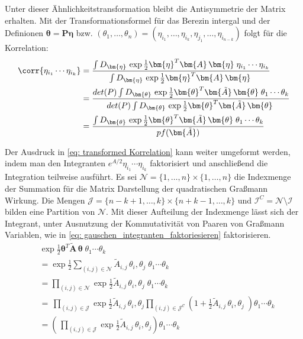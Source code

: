\noindent Unter dieser Ähnlichkeitstransformation bleibt die Antisymmetrie der Matrix erhalten. Mit der Transformationsformel für das Berezin intergal und der Definionen $ \bm{\theta} = \bm{P} \bm{\eta} $ bzw. $ (\theta_1, \dots, \theta_n) =  (\eta_{i_1}, \dots ,\eta_{i_k}, \eta_{j_1}, \dots, \eta_{i_{n-k}}) $ folgt für die Korrelation: 
\begin{align}
\corr{\eta_{i_1} \cdots \eta_{i_k}} 
    & = \frac{\int D_{\bm{\eta}}\, \exp{ \frac{1}{2}\bm{\eta}^T \bm{A}\, \bm{\eta}\;}  \eta_{i_1}\cdots\eta_{i_k}}{\int D_{\bm{\eta}} \,\exp{\frac{1}{2} \bm{\eta}^T \bm{A}\, \bm{\eta}\;}} \nonumber \\
    & =  \frac{ det(P) \int D_{\bm{\theta}}\, \exp{ \frac{1}{2} \bm{\theta}^T \bm{\tilde{A}}\, \bm{\theta}\;}  \theta_{1}\cdots\theta_k}{det(P) \int D_{\bm{\theta}} \,\exp{ \frac{1}{2} \bm{\theta}^T \bm{\tilde{A}}\, \bm{\theta}\;}} \nonumber \\
    & = \frac{ \int D_{\bm{\theta}}\, \exp{ \frac{1}{2} \bm{\theta}^T \bm{\tilde{A}}\, \bm{\theta}\;}  \theta_{1}\cdots\theta_k}{pf(\bm{\tilde{A}})} \label{eq: transformed Korrelation}
\end{align}

\noindent Der Ausdruck in \eqref{eq: transformed Korrelation} kann weiter umgeformt werden, indem man den Integranten $e^{A/2}\eta_{i_1} \cdots \eta_{i_k}$ faktorisiert und anschließend die Integration teilweise ausführt. Es sei $\mathcal{N} = \{1,\dots,n\} \times \{1,\dots,n\}$ die Indexmenge der Summation für die Matrix Darstellung \label{eq: Graßmann Transformationsformel} der quadratischen Graßmann Wirkung. Die Mengen $\mathcal{J} = \{n-k+1,\dots,k\} \times \{n+k-1,\dots,k\}$ und $\mathcal{I}^C = \mathcal{N} \setminus \mathcal{I} $ bilden eine Partition von $\mathcal{N}$. Mit dieser Aufteilung der Indexmenge lässt sich der Integrant, unter Ausnutzung der Kommutativität von Paaren von Graßmann Variablen, wie in \eqref{eq: gauschen_integranten_faktoriesieren} faktorisieren.
\begin{align}
    &\exp{ \frac{1}{2} \bm{\theta}^T \bm{\tilde{A}}\, \bm{\theta}\;}  \theta_{1}\cdots\theta_k \nonumber \\
    & = \exp{ \frac{1}{2}\sum_{(i,j) \in \mathcal{N}} \tilde A_{i,j}\, \theta_i, \theta_j\;}  \theta_{1}\cdots\theta_k \nonumber\\
    & = \prod_{(i,j) \in \mathcal{N}} \exp{ \frac{1}{2} \tilde A_{i,j}\, \theta_i, \theta_j\;}  \theta_{1}\cdots\theta_k \nonumber \\
    & = \, \prod_{(i,j) \in \mathcal{J}} \exp{ \frac{1}{2} \tilde A_{i,j}\, \theta_i, \theta_j} \prod_{(i,j)\in \mathcal{J^C}} \left( 1 + \frac{1}{2} \tilde A_{i,j}\, \theta_i, \theta_j\;\right) \theta_{1}\cdots\theta_k \nonumber \\
     & = \left(\, \prod_{(i,j) \in \mathcal{J}} \exp{ \frac{1}{2} \tilde A_{i,j}\, \theta_i, \theta_j}\right) \theta_{1}\cdots\theta_k  \label{eq: gauschen_integranten_faktoriesieren}
\end{align}

